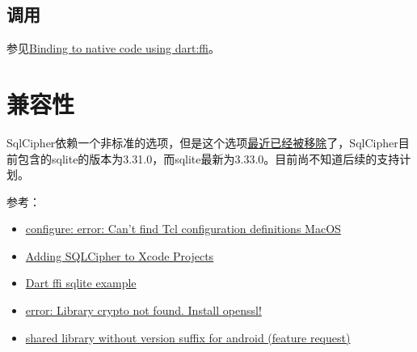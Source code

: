 \documentclass[12pt]{article}
\begin{document}
\subsection{调用}\label{ux8c03ux7528}

参见\href{https://flutter.dev/docs/development/platform-integration/c-interop}{Binding to native code using dart:ffi}。

\section{兼容性}\label{ux517cux5bb9ux6027}

SqlCipher依赖一个非标准的选项，但是这个选项\href{https://discuss.zetetic.net/t/removal-of-sqlite-has-codec-compile-time-option-from-public-sqlite-code/4262}{最近已经被移除}了，SqlCipher目前包含的sqlite的版本为3.31.0，而sqlite最新为3.33.0。目前尚不知道后续的支持计划。

参考：

\begin{itemize}
\tightlist
\item
  \href{https://github.com/petasis/tkdnd/issues/16}{configure: error: Can't find Tcl configuration definitions MacOS}
\item
  \href{https://www.zetetic.net/sqlcipher/ios-tutorial/}{Adding SQLCipher to Xcode Projects}
\item
  \href{https://github.com/dart-lang/sdk/blob/master/samples/ffi/sqlite/}{Dart ffi sqlite example}
\item
  \href{https://github.com/sqlcipher/sqlcipher/issues/132\#issuecomment-122912569}{error: Library crypto not found. Install openssl!}
\item
  \href{https://github.com/openssl/openssl/issues/3902}{shared library without version suffix for android (feature request)}
\end{itemize}
\end{document}

